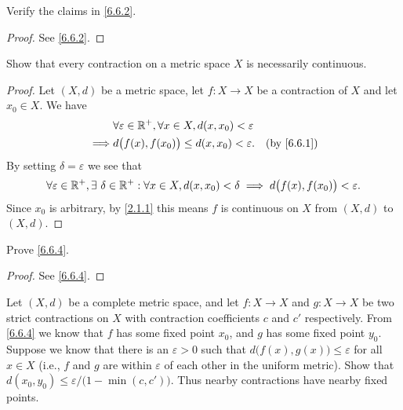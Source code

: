 \begin{ex}\label{ex:6.6.5}
  Verify the claims in \cref{6.6.2}.
\end{ex}

\begin{proof}
  See \cref{6.6.2}.
\end{proof}

\begin{ex}\label{ex:6.6.6}
  Show that every contraction on a metric space \(X\) is necessarily continuous.
\end{ex}

\begin{proof}
  Let \((X, d)\) be a metric space, let \(f : X \to X\) be a contraction of \(X\) and let \(x_0 \in X\).
  We have
  \begin{align*}
             & \forall \varepsilon \in \R^+, \forall x \in X, d(x, x_0) < \varepsilon                            \\
    \implies & d\big(f(x), f(x_0)\big) \leq d(x, x_0) < \varepsilon.                  & \text{(by \cref{6.6.1})}
  \end{align*}
  By setting \(\delta = \varepsilon\) we see that
  \[
    \forall \varepsilon \in \mathbb{R}^+, \exists\ \delta \in \mathbb{R}^+ : \forall x \in X, d(x, x_0) < \delta \implies d\big(f(x), f(x_0)\big) < \varepsilon.
  \]
  Since \(x_0\) is arbitrary, by \cref{2.1.1} this means \(f\) is continuous on \(X\) from \((X, d)\) to \((X, d)\).
\end{proof}

\begin{ex}\label{ex:6.6.7}
  Prove \cref{6.6.4}.
\end{ex}

\begin{proof}
  See \cref{6.6.4}.
\end{proof}

\begin{ex}\label{ex:6.6.8}
  Let \((X, d)\) be a complete metric space, and let \(f : X \to X\) and \(g : X \to X\) be two strict contractions on \(X\) with contraction coefficients \(c\) and \(c'\) respectively.
  From \cref{6.6.4} we know that \(f\) has some fixed point \(x_0\), and \(g\) has some fixed point \(y_0\).
  Suppose we know that there is an \(\varepsilon > 0\) such that \(d\big(f(x), g(x)\big) \leq \varepsilon\) for all \(x \in X\)
  (i.e., \(f\) and \(g\) are within \(\varepsilon\) of each other in the uniform metric).
  Show that \(d(x_0, y_0) \leq \varepsilon / \big(1 - \min(c, c')\big)\).
  Thus nearby contractions have nearby fixed points.
\end{ex}

